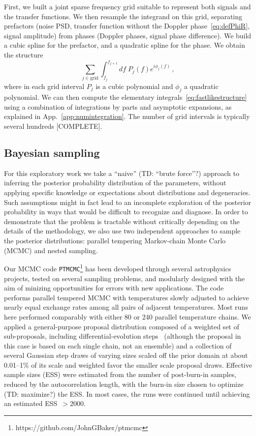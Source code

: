 \documentclass[aps,showpacs,twocolumn,prd,superscriptaddress,nofootinbib]{revtex4-1}
\newcommand{\be}{\begin{equation}}
\newcommand{\ee}{\end{equation}}
\newcommand{\SM}[1]{{\color{Blue} #1}}
\newcommand{\tdc}[1]{{\color{red} (TD: #1)}}
\begin{document}
First, we built a joint sparse frequency grid suitable to represent both signals and the transfer functions. We then resample the integrand on this grid, separating prefactors (noise PSD, transfer function without the Doppler phase~\eqref{eq:defPhiR}, signal amplitude) from phases (Doppler phases, signal phase difference). We build a cubic spline for the prefactor, and a quadratic spline for the phase. We obtain the structure
\be\label{eq:fastlikestructure}
	\sum_{j \in \mathrm{grid}} \int_{f_{j}}^{f_{j+1}} df \; P_{j} (f) e^{i \phi_{j} (f)} \,,
\ee
where in each grid interval $P_{j}$ is a cubic polynomial and $\phi_{j}$ a quadratic polynomial. We can then compute the elementary integrals~\eqref{eq:fastlikestructure} using a combination of integrations by parts and asymptotic expansions, as explained in App.~\ref{app:numintegration}. The number of grid intervals is typically several hundreds \SM{[COMPLETE]}.



\subsection{Bayesian sampling}
\label{sec:samplers}

For this exploratory work we take a ``naive'' \tdc{``brute force''?} approach to inferring the posterior probability distribution of the parameters, without applying specific knowledge or expectations about distributions and degeneracies. Such assumptions might in fact lead to an incomplete exploration of the posterior probability in ways that would be difficult to recognize and diagnose. In order to demonstrate that the problem is tractable without critically depending on the details of the methodology, we also use two independent approaches to sample the posterior distributions: parallel tempering Markov-chain Monte Carlo (MCMC) and nested sampling.

Our MCMC code \texttt{PTMCMC}\footnote{https://github.com/JohnGBaker/ptmcmc} has been developed through several astrophysics projects, tested on several sampling problems, and modularly designed with the aim of minizing opportunities for errors with new applications. The code performs parallel tempered MCMC \cite{Swendsen+1986,Littenberg2009} with temperatures slowly adjusted to achieve nearly equal exchange rates among all pairs of adjacent temperatures.  Most runs here performed comparably with either 80 or 240 parallel temperature chains.
We applied a general-purpose proposal distribution composed of a weighted set of sub-proposals, including differential-evolution steps~\cite{Vrugt+2008} (although the proposal in this case is based on each single chain, not an ensemble) and a collection of several Gaussian step draws of varying sizes scaled off the prior domain at about 0.01--1\% of its scale and weighted favor the smaller scale proposal draws.
Effective sample sizes (ESS) were estimated from the number of post-burn-in samples, reduced by the autocorrelation length, with the burn-in size chosen to optimize \tdc{maximize?} the ESS. In most cases, the runs were continued until achieving an estimated ESS~$>2000$.
  
\end{document}
